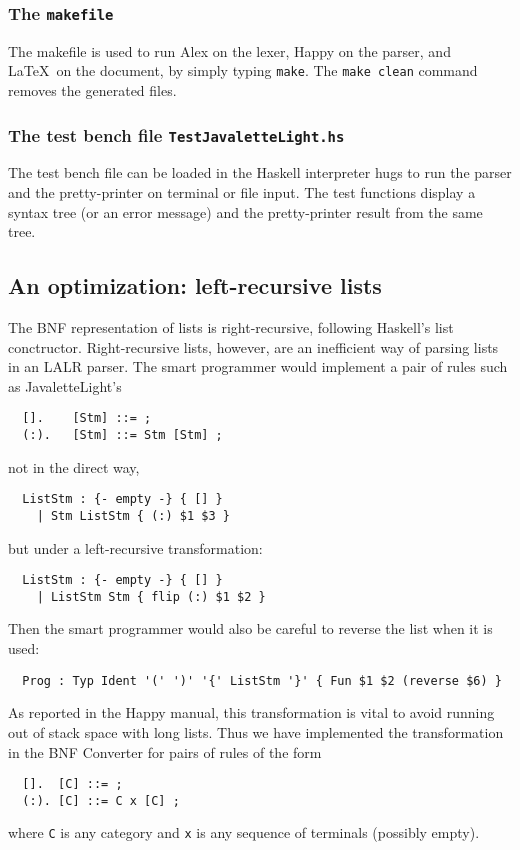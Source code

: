 \documentclass[10pt]{article}
\begin{document}
\subsubsection{The {\tt makefile}}

The makefile is used to run Alex on the lexer, Happy on the parser, and
\LaTeX\ on the document, by simply typing {\tt make}. The {\tt make clean}
command removes the generated files.



\subsubsection{The test bench file {\tt TestJavaletteLight.hs}}

The test bench file can be loaded in the Haskell interpreter hugs to
run the parser and the pretty-printer on terminal or file input.
The test functions display a syntax tree (or an error message)
and the pretty-printer result from the same tree.


\subsection{An optimization: left-recursive lists}

\label{leftrec}

The BNF representation of lists is right-recursive, following Haskell's
list conctructor. Right-recursive lists, however, are an inefficient way of parsing
lists in an LALR parser. The smart programmer would implement a pair of rules
such as JavaletteLight's
\begin{verbatim}
  [].    [Stm] ::= ;
  (:).   [Stm] ::= Stm [Stm] ;
\end{verbatim}
not in the direct way,
\begin{verbatim}
  ListStm : {- empty -} { [] } 
    | Stm ListStm { (:) $1 $3 }
\end{verbatim}
but under a left-recursive transformation:
\begin{verbatim}
  ListStm : {- empty -} { [] } 
    | ListStm Stm { flip (:) $1 $2 }
\end{verbatim}
Then the smart programmer would also be careful to reverse the list
when it is used:
\begin{verbatim}
  Prog : Typ Ident '(' ')' '{' ListStm '}' { Fun $1 $2 (reverse $6) } 
\end{verbatim}%
As reported in the Happy manual, this transformation is vital
to avoid running out of stack space with long lists.
Thus we have implemented the transformation in the BNF Converter for
pairs of rules of the form
\begin{verbatim}
  [].  [C] ::= ;
  (:). [C] ::= C x [C] ;
\end{verbatim}
where {\tt C} is any category and {\tt x} is any sequence of
terminals (possibly empty).
\end{document}
